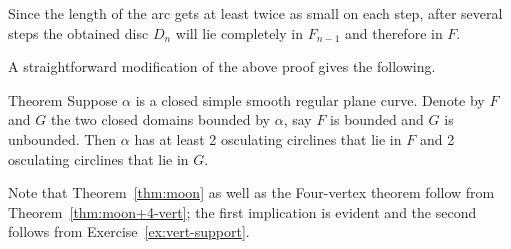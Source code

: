 Since the length of the arc gets at least twice as small on each step, 
after several steps the obtained disc $D_n$ will lie completely in $F_{n-1}$ and therefore in $F$. 
\qeds

A straightforward modification of the above proof gives the following.

\begin{thm}{Theorem}\label{thm:moon+4-vert}
Suppose $\alpha$ is a closed simple smooth regular plane curve.
Denote by $F$ and $G$ the two closed domains bounded by $\alpha$, say $F$ is bounded and $G$ is unbounded.  
Then $\alpha$ has at least 2 osculating circlines that lie in $F$
and  2 osculating circlines that lie in $G$. 
\end{thm}

Note that Theorem~\ref{thm:moon} as well as the Four-vertex theorem \label{thm:4-vert} follow from Theorem~\ref{thm:moon+4-vert};
the first implication is evident and the second follows from Exercise~\ref{ex:vert-support}.

\warning

